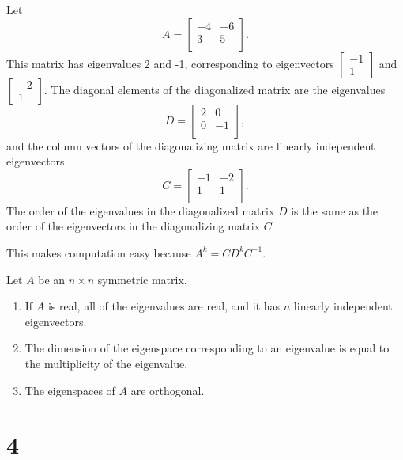 \documentclass{article}
\begin{document}
    Let
    \[
    A = 
    \begin{bmatrix}
        -4 & -6 \\
        3 & 5 \\
    \end{bmatrix}.
    \]
    This matrix has eigenvalues 2 and -1, 
    corresponding to eigenvectors $\begin{bmatrix} -1 \\ 1 \end{bmatrix}$ and $\begin{bmatrix} -2 \\ 1 \end{bmatrix}$. 
    The diagonal elements of the diagonalized matrix are the eigenvalues
    \[
    D = 
    \begin{bmatrix}
        2 & 0 \\
        0 & -1 \\
    \end{bmatrix},
    \]
    and the column vectors of the diagonalizing matrix are linearly independent eigenvectors
    \[
    C = 
    \begin{bmatrix}
        -1 & -2 \\
        1 & 1 \\
    \end{bmatrix}.
    \]
    The order of the eigenvalues in the diagonalized matrix $D$
    is the same as the order of the eigenvectors in the diagonalizing matrix $C$.

    This makes computation easy because $A^k = CD^kC^{-1}$. 

    Let $A$ be an $n \times n$ symmetric matrix. 
    \begin{enumerate}
        \item If $A$ is real, all of the eigenvalues are real, and it has $n$ linearly independent eigenvectors.
        \item The dimension of the eigenspace corresponding to an eigenvalue is equal to the multiplicity of the eigenvalue.
        \item The eigenspaces of $A$ are orthogonal. 
    \end{enumerate}

    \section*{4}
    
\end{document}
